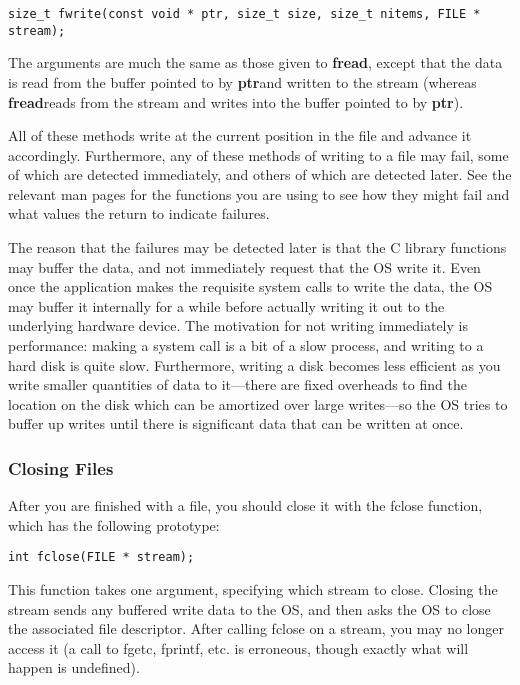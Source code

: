 \documentclass[11pt, a4paper]{article}
\begin{document}
\texttt{size\_t fwrite(const void * ptr, size\_t size, size\_t nitems, FILE * stream);} 


The arguments are much the same as those given to \textbf{fread}, except that the data is read from the buffer pointed to by \textbf{ptr}and written to the stream (whereas \textbf{fread}reads from the stream and writes into the buffer pointed to by \textbf{ptr}).




All of these methods write at the current position in the file and advance it accordingly. Furthermore, any of these methods of writing to a file may fail, some of which are detected immediately, and others of which are detected later. See the relevant man pages for the functions you are using to see how they might fail and what values the return to indicate failures.


The reason that the failures may be detected later is that the C library functions may buffer the data, and not immediately request that the OS write it. Even once the application makes the requisite system calls to write the data, the OS may buffer it internally for a while before actually writing it out to the underlying hardware device. The motivation for not writing immediately is performance: making a system call is a bit of a slow process, and writing to a hard disk is quite slow. Furthermore, writing a disk becomes less efficient as you write smaller quantities of data to it—there are fixed overheads to find the location on the disk which can be amortized over large writes—so the OS tries to buffer up writes until there is significant data that can be written at once.





\subsubsection{Closing Files}%
\label{ssub:closing_files}


After you are finished with a file, you should close it with the fclose function, which has the following prototype:


\texttt{int fclose(FILE * stream);} 


This function takes one argument, specifying which stream to close. Closing the stream sends any buffered write data to the OS, and then asks the OS to close the associated file descriptor. After calling fclose on a stream, you may no longer access it (a call to fgetc, fprintf, etc. is erroneous, though exactly what will happen is undefined).
\end{document}
